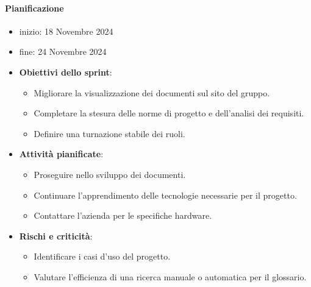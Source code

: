 \documentclass{article}
\begin{document}
                \paragraph{Pianificazione}
                \begin{itemize}
                    \item inizio: 18 Novembre 2024
                    \item fine: 24 Novembre 2024
                \end{itemize}
                \begin{itemize}
                    \item \textbf{Obiettivi dello sprint}:
                        \begin{itemize}
                            \item Migliorare la visualizzazione dei documenti sul sito del gruppo.
                            \item Completare la stesura delle norme di progetto e dell'analisi dei requisiti.
                            \item Definire una turnazione stabile dei ruoli.
                        \end{itemize}
                    \item \textbf{Attività pianificate}:
                        \begin{itemize}
                            \item Proseguire nello sviluppo dei documenti.
                            \item Continuare l'apprendimento delle tecnologie necessarie per il progetto.
                            \item Contattare l'azienda per le specifiche hardware.
                        \end{itemize}
                    \item \textbf{Rischi e criticità}:
                        \begin{itemize}
                            \item Identificare i casi d'uso del progetto.
                            \item Valutare l'efficienza di una ricerca manuale o automatica per il glossario.
                        \end{itemize}
                \end{itemize}

\end{document}
